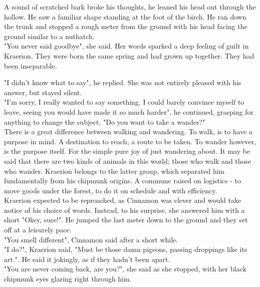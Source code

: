 \documentclass[smalldemyvopaper,11pt,twoside,onecolumn,openright,extrafontsizes]{memoir}
\newlength\drop
\begin{document}
A sound of scratched bark broke his thoughts, he leaned his head out through the hollow. He saw a familiar shape standing at the foot of the birch. He ran down the trunk and stopped a rough meter from the ground with his head facing the ground similar to a nuthatch.\\

"You never said goodbye", she said. Her words sparked a deep feeling of guilt in Kraerion. They were born the same spring and had grown up together. They had been inseparable. 

"I didn't know what to say", he replied. She was not entirely pleased with his answer, but stayed silent.\\

"I'm sorry, I really wanted to say something. I could barely convince myself to leave, seeing you would have made it so much harder", he continued, grasping for anything to change the subject. "Do you want to take a wander?" \\ 

There is a great difference between walking and wandering. To walk, is to have a purpose in mind. A destination to reach, a route to be taken. To wander however, is the purpose itself. For the simple pure joy of just wandering about. It may be said that there are two kinds of animals in this world; those who walk and those who wander. Kraerion belongs to the latter group, which separated him fundamentally from his chipmunk origins. A commune raised on logistics - to move goods under the forest, to do it on schedule and with efficiency. \\

Kraerion expected to be reproached, as Cinnamon was clever and would take notice of his choice of words. Instead, to his surprise, she answered him with a short "Okey, sure!". He jumped the last meter down to the ground and they set off at a leisurely pace. \\

"You smell different", Cinnamon said after a short while.\\

"I do?", Kraerion said, "Must be those damn pigeons, passing droppings like its art.". He said it jokingly, as if they hadn't been apart. \\

"You are never coming back, are you?", she said as she stopped, with her black chipmunk eyes glaring right through him. \\
\end{document}
